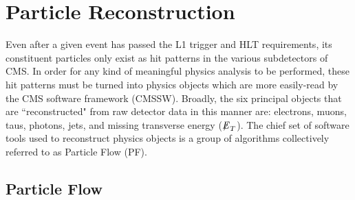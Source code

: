\section{Particle Reconstruction}

Even after a given event has passed the L1 trigger and HLT requirements, its constituent particles only exist as hit patterns in the various subdetectors of CMS. In order for any kind of meaningful physics analysis to be performed, these hit patterns must be turned into physics objects which are more easily-read by the CMS software framework (CMSSW). Broadly, the six principal objects that are ``reconstructed" from raw detector data in this manner are: electrons, muons, taus, photons, jets, and missing transverse energy (${\not\mathrel{E}}_T$). The chief set of software tools used to reconstruct physics objects is a group of algorithms collectively referred to as Particle Flow (PF).

\subsection{Particle Flow}

